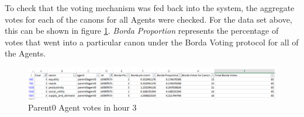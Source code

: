 To check that the voting mechanism was fed back into the system, the aggregate votes for each of the canons for all Agents were checked. For the data set above, this can be shown in figure \ref{fig:AgentVotes}. \textit{Borda Proportion} represents the percentage of votes that went into a particular canon under the Borda Voting protocol for all of the Agents.

\begin{figure}[h!]
	\centering
	\includegraphics[scale=0.34]{Images/test-allocation4.png}
	\caption{Parent0 Agent votes in hour 3}
	\label{fig:AgentVotes}
\end{figure}

